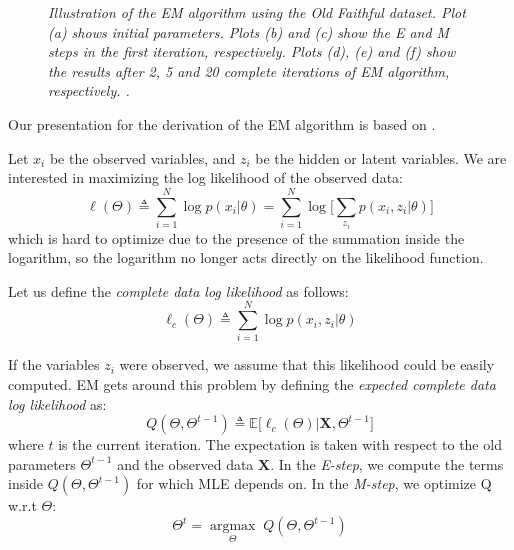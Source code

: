 \begin{figure}[ht!]
\begin{center}
{        }
    \end{center}
    \caption{\emph{Illustration of the EM algorithm using the Old Faithful dataset. Plot (a) shows initial parameters. Plots (b) and (c) show the E and M steps in the first iteration, respectively. Plots (d), (e) and (f) show the results after 2, 5 and 20 complete iterations of EM algorithm, respectively. \cite[Ch. \ 9]{Bishop2006}.}}
   \label{em-algorithm-pic}
\end{figure}

Our presentation for the derivation of the EM algorithm is based on \cite[Ch. \ 11]{Murphy2012}.

Let $x_{i}$ be the observed variables, and $z_{i}$ be the hidden or latent variables. We are interested in maximizing the log likelihood of the observed data:
\begin{equation} \label{log-lik-observed-f-mm}
	\ell(\Theta) \triangleq \sum_{i=1}^{N} \log p(x_{i}|\theta) =  \sum_{i=1}^{N} \log \bigg[\sum_{z_{i}} p(x_{i}, z_{i}|\theta) \bigg]
\end{equation}
which is hard to optimize due to the presence of the summation inside the logarithm, so the logarithm no longer acts directly on the likelihood function.

Let us define the \emph{complete data log likelihood} as follows:
\begin{equation} \label{log-lik-comp-observed-f-mm}
	\ell_{c}(\Theta) \triangleq \sum_{i=1}^{N} \log p(x_{i}, z_{i}|\theta)
\end{equation}

If the variables $z_{i}$ were observed, we assume that this likelihood could be easily computed. EM gets around this problem by defining the \emph{expected complete data log likelihood} as:
\begin{equation} \label{log-lik-expected-f-mm}
		Q(\Theta, \Theta^{t-1}) \triangleq \mathbb{E} \big[\ell_{c}(\Theta) | \mathbf{X}, \Theta^{t-1}\big]
\end{equation}
where $t$ is the current iteration. The expectation is taken with respect to the old parameters $\Theta^{t-1}$ and the observed data $\mathbf{X}$. In the \emph{E-step}, we compute the terms inside $Q(\Theta, \Theta^{t-1})$ for which MLE depends on. In the \emph{M-step}, we optimize Q w.r.t $\Theta$:
\begin{equation} \label{max-log-lik-observed-f-mm}
	\Theta^{t} = \underset{\Theta}{\operatorname{argmax}} \; Q(\Theta, \Theta^{t-1})
\end{equation}

